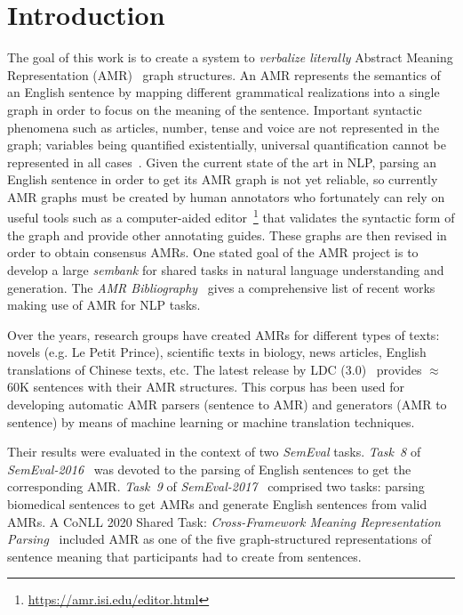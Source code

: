 \documentclass[12pt]{article}
\newcommand{\representation}[1]{\textsf{#1}}
\newcommand{\AMR}{\representation{AMR}}
\begin{document}
\section{Introduction} %
\label{sec:introduction}

The goal of this work is to create a system to \emph{verbalize literally} Abstract Meaning Representation (\AMR{})~\cite{W13-2322} graph structures. An \AMR{} represents the semantics of an English sentence by mapping different grammatical realizations into a single graph in order to focus on the meaning of the sentence. Important syntactic phenomena such as articles, number, tense and voice are not represented in the graph; variables being quantified existentially, universal quantification cannot be represented in all cases~\cite{Bos:2016:EPA:3030588.3030594}. Given the current state of the art in NLP, parsing an English sentence in order to get its \AMR{} graph is not yet reliable, so currently \AMR{} graphs must be created by human annotators who fortunately can rely on useful tools such as a computer-aided editor~\cite{AMR-Editor}\footnote{\url{https://amr.isi.edu/editor.html}} that validates the syntactic form of the graph and provide other annotating guides. These graphs are then revised in order to obtain consensus \AMR{}s. One stated goal of the \AMR{} project is to develop a large \emph{sembank} for shared tasks in natural language understanding and generation. The \emph{AMR Bibliography}~\cite{AMRBib} gives a comprehensive list of recent works making use of \AMR{} for NLP tasks.

Over the years, research groups have created \AMR{}s for different types of texts: novels (e.g. Le Petit Prince), scientific texts in biology, news articles, English translations of Chinese texts,  etc. The latest release by LDC (3.0)~\cite{AMR-Release3} provides $\approx{}$60K sentences with their \AMR{} structures.  This corpus has been used for developing automatic \AMR{} parsers (sentence to \AMR{}) %
and generators (\AMR{} to sentence) by means of machine learning or machine translation techniques. 

Their results were evaluated in the context of two \emph{SemEval} tasks. \emph{Task~8} of \emph{SemEval-2016}~\cite{SemEval2016-T8-Desc} was devoted to the parsing of English sentences to get the corresponding \AMR{}. \emph{Task~9} of \emph{SemEval-2017}~\cite{SemEval2017-T9-Desc} comprised two tasks: parsing biomedical sentences to get \AMR{}s and generate English sentences from valid \AMR{}s. 
A CoNLL 2020 Shared Task: \emph{Cross-Framework Meaning Representation Parsing}~\cite{oepen-etal-2020-mrp} included \AMR{} as one of the five graph-structured representations of sentence meaning that participants had to create from sentences.
\end{document}
